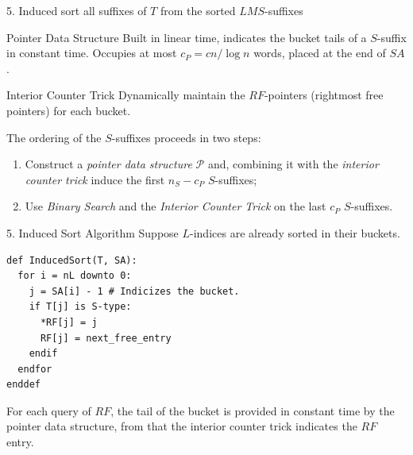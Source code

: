 \documentclass{beamer}
\begin{document}
  \begin{frame}{5. Induced sort all suffixes of $T$ from the sorted $LMS$-suffixes}\label{5}
    \begin{block}{Pointer Data Structure}
      \vspace{1pt}
      Built in linear time, indicates the bucket tails of a $S$-suffix in constant time. Occupies at most $c_P = cn/\log n$ words, placed at the end of $SA$. \hyperlink{AUX5.pointer}{}
    \end{block}
    \begin{block}{Interior Counter Trick}
      \vspace{1pt}
      Dynamically maintain the $RF$-pointers (rightmost free pointers) for each bucket. \hyperlink{AUX5.counter}{}
    \end{block}
    \pause
    The ordering of the $S$-suffixes proceeds in two steps:
    \begin{enumerate}
      \item Construct a \textit{pointer data structure} $\mathcal{P}$ and, combining it with the \textit{interior counter trick} induce the first $n_S - c_P$ $S$-suffixes;
      \item Use \textit{Binary Search} and the \textit{Interior Counter Trick} on the last $c_P$ $S$-suffixes.
    \end{enumerate}
  \end{frame}


  \begin{frame}[fragile]{5. Induced Sort Algorithm}
    Suppose $L$-indices are already sorted in their buckets.
    \begin{lstlisting}
def InducedSort(T, SA):
  for i = nL downto 0:
    j = SA[i] - 1 # Indicizes the bucket.
    if T[j] is S-type:
      *RF[j] = j
      RF[j] = next_free_entry
    endif
  endfor
enddef
    \end{lstlisting}

    For each query of $RF$, the tail of the bucket is provided in constant time by the pointer data structure, from that the interior counter trick indicates the $RF$ entry.
  \end{frame}
\end{document}
